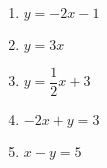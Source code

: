     \begin{enumerate}[resume]
    		\item  $ y = -2x - 1 $
    		\item  $ y = 3x $
    		\item $ y = \dfrac{1}{2}x + 3$	
    		\item  $ -2x + y = 3 $
    		\item  $ x - y = 5 $
    \end{enumerate}
    
